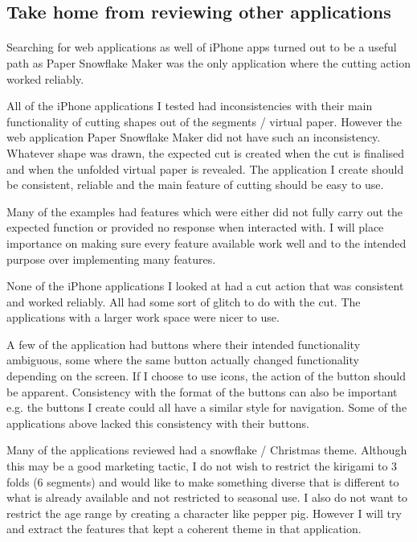 \documentclass[11pt]{article}
\begin{document}
       \subsection{Take home from reviewing other applications}
       
            \paragraph{}
            Searching for web applications as well of iPhone apps turned out to be a useful path as Paper Snowflake Maker was the only application where the cutting action worked reliably.
            
            All of the iPhone applications I tested had inconsistencies with their main functionality of cutting shapes out of the segments / virtual paper. However the web application Paper Snowflake Maker did not have such an inconsistency. Whatever shape was drawn, the expected cut is created when the cut is finalised and when the unfolded virtual paper is revealed. The application I create should be consistent, reliable and the main feature of cutting should be easy to use.  
            
            Many of the examples had features which were either did not fully carry out the expected function or provided no response when interacted with. I will place importance on making sure every feature available work well and to the intended purpose over implementing many features. 
            
            None of the iPhone applications I looked at had a cut action that was consistent and worked reliably. All had some sort of glitch to do with the cut. The applications with a larger work space were nicer to use. 
            
            A few of the application had buttons where their intended functionality ambiguous, some where the same button actually changed functionality depending on the screen. If I choose to use icons, the action of the button should be apparent. Consistency with the format of the buttons can also be important e.g. the buttons I create could all have a similar style for navigation. Some of the applications above lacked this consistency with their buttons. 
            
            Many of the applications reviewed had a snowflake / Christmas theme. Although this may be a good marketing tactic, I do not wish to restrict the kirigami to 3 folds (6 segments) and would like to make something diverse that is different to what is already available and not restricted to seasonal use. I also do not want to restrict the age range by creating a character like pepper pig. However I will try and extract the features that kept a coherent theme in that application.
            
\end{document}
